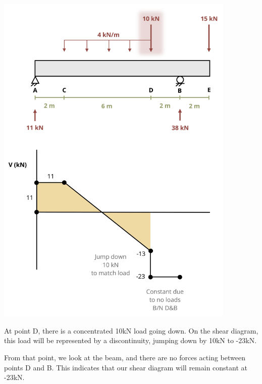 \documentclass[
  letterpaper,
  DIV=11,
  numbers=noendperiod]{scrreprt}
\begin{document}
\begin{tcolorbox}
\begin{center}
\includegraphics[width=4.52083in,height=\textheight]{images/CH7 PNGs/example 7.3 part 5.png}
\end{center}

At point D, there is a concentrated 10kN load going down. On the shear
diagram, this load will be represented by a discontinuity, jumping down
by 10kN to -23kN.

From that point, we look at the beam, and there are no forces acting
between points D and B. This indicates that our shear diagram will
remain constant at -23kN.


\end{tcolorbox}
\end{document}
